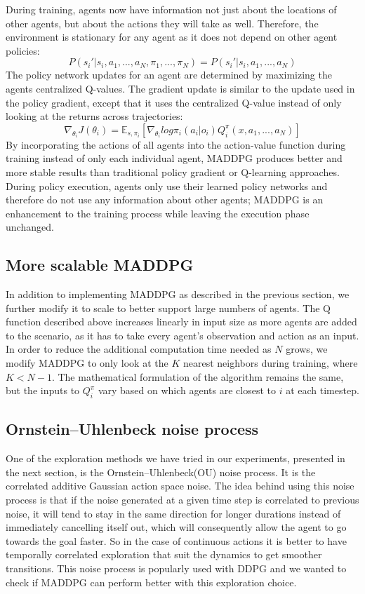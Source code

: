 \documentclass{article}
\begin{document}
During training, agents now have information not just about the locations of other agents, but about the actions they will take as well. Therefore, the environment is stationary for any agent as it does not depend on other agent policies:
$$P(s_i'|s_i, a_1, ..., a_N, \pi_1, ..., \pi_N) = P(s_i'|s_i, a_1, ..., a_N)$$
The policy network updates for an agent are determined by maximizing the agents centralized Q-values. The gradient update is similar to the update used in the policy gradient, except that it uses the centralized Q-value instead of only looking at the returns across trajectories:
$$\nabla_{\theta_i}J(\theta_i) = \mathbb{E}_{s, \pi_i}[\nabla_{\theta_i}log \pi_i(a_i|o_i)Q^{\pi}_i(x, a_1, ..., a_N)]$$
By incorporating the actions of all agents into the action-value function during training instead of only each individual agent, MADDPG produces better and more stable results than traditional policy gradient or Q-learning approaches. During policy execution, agents only use their learned policy networks and therefore do not use any information about other agents; MADDPG is an enhancement to the training process while leaving the execution phase unchanged.

\subsection{More scalable MADDPG}
In addition to implementing MADDPG as described in the previous section, we further modify it to scale to better support large numbers of agents. The Q function described above increases linearly in input size as more agents are added to the scenario, as it has to take every agent's observation and action as an input. In order to reduce the additional computation time needed as $N$ grows, we modify MADDPG to only look at the $K$ nearest neighbors during training, where $K < N-1$. The mathematical formulation of the algorithm remains the same, but the inputs to $Q^\pi_i$ vary based on which agents are closest to $i$ at each timestep.

\subsection{Ornstein–Uhlenbeck noise process}
One of the exploration methods we have tried in our experiments, presented in the next section, is the Ornstein–Uhlenbeck(OU) noise process. It is the correlated additive Gaussian action space noise. The idea behind using this noise process is that if the noise generated at a given time step is correlated to previous noise, it will tend to stay in the same direction for longer durations instead of immediately cancelling itself out, which will consequently allow the agent to go towards the goal faster. So in the case of continuous actions it is better to have temporally correlated exploration that suit the dynamics to get smoother transitions. This noise process is popularly used with DDPG and we wanted to check if MADDPG can perform better with this exploration choice.
\end{document}
